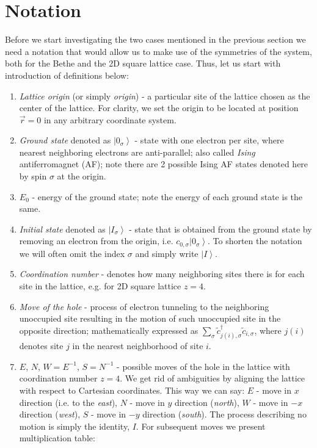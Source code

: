 \documentclass{article}
\newcommand{\ket}[1]{\left\vert #1 \right\rangle}
\begin{document}
\section{Notation}
Before we start investigating the two cases mentioned in the previous section we need a notation that would allow us to make use of the symmetries of the system, both for the Bethe and the 2D square lattice case. Thus, let us start with introduction of definitions below:
\begin{enumerate}
    \item \textit{Lattice origin} (or simply \textit{origin}) - a particular site of the lattice chosen as the center of the lattice. For clarity, we set the origin to be located at position $\vec{r} = 0$ in any arbitrary coordinate system.
    
    \item \textit{Ground state} denoted as $\ket{0_\sigma}$ - state with one electron per site, where nearest neighboring electrons are anti-parallel; also called \textit{Ising} antiferromagnet (AF); note there are 2 possible Ising AF states denoted here by spin $\sigma$ at the origin.
    
    \item $E_{0}$ - energy of the ground state; note the energy of each ground state is the same.
    
    \item \textit{Initial state} denoted as $\ket{I_\sigma}$ - state that is obtained from the ground state by removing an electron from the origin, i.e. $c_{0,\sigma}\ket{0_\sigma}$. To shorten the notation we will often omit the index $\sigma$ and simply write $\ket{I}$.
    
    \item \textit{Coordination number} - denotes how many neighboring sites there is for each site in the lattice, e.g. for 2D square lattice $z = 4$.
    
    \item \textit{Move of the hole} - process of electron tunneling to the neighboring unoccupied site resulting in the motion of such unoccupied site in the opposite direction; mathematically expressed as $\sum_{\sigma} \tilde{c}_{j(i),\sigma}^{\dag} \tilde{c}_{i,\sigma}$, where $j(i)$ denotes site $j$ in the nearest neighborhood of site $i$.
    
    \item $E$, $N$, $W = E^{-1}$, $S = N^{-1}$ - possible moves of the hole in the lattice with coordination number $z = 4$. We get rid of ambiguities by aligning the lattice with respect to Cartesian coordinates. This way we can say: $E$ - move in $x$ direction (i.e. to the \textit{east}), $N$ - move in $y$ direction (\textit{north}), $W$ - move in $-x$ direction (\textit{west}), $S$ - move in $-y$ direction (\textit{south}). The process describing no motion is simply the identity, $I$. For subsequent moves we present multiplication table:
    

\end{enumerate}
\end{document}
